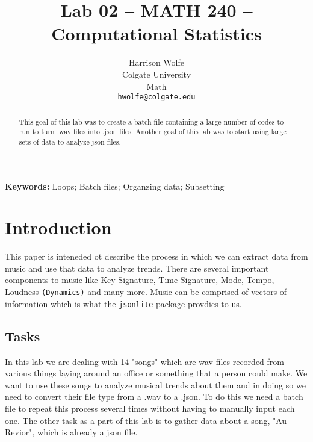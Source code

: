 \documentclass{article}\usepackage[]{graphicx}\usepackage[]{xcolor}
\begin{document}
\vspace{-1in}
\title{Lab 02 -- MATH 240 -- Computational Statistics}

\author{
  Harrison Wolfe \\
  Colgate University  \\
  Math  \\
  {\tt hwolfe@colgate.edu}
}

\date{}

\maketitle

\begin{multicols}{2}
\begin{abstract}

This goal of this lab was to create a batch file containing a large number of codes to run to turn .wav files into .json files. Another goal of this lab was to start using large sets of data to analyze json files. 
\end{abstract}

\noindent \textbf{Keywords:} Loops; Batch files; Organzing data; Subsetting

\section{Introduction}

This paper is inteneded ot describe the process in which we can extract data from music and use that data to analyze trends. There are several important components to music like Key Signature, Time Signature, Mode, Tempo, Loudness \verb|(Dynamics)| and many more. Music can be comprised of vectors of information which is what the \texttt{jsonlite} package provdies to us. \citep{jsonlite} 
\subsection{Tasks}
In this lab we are dealing with 14 "songs" which are wav files recorded from various things laying around an office or something that a person could make. We want to use these songs to analyze musical trends about them and in doing so we need to convert their file type from a .wav to a .json. To do this we need a batch file to repeat this process several times without having to manually input each one. The other task as a part of this lab is to gather data about a song, "Au Revior", which is already a json file. 




\end{multicols}
\end{document}

